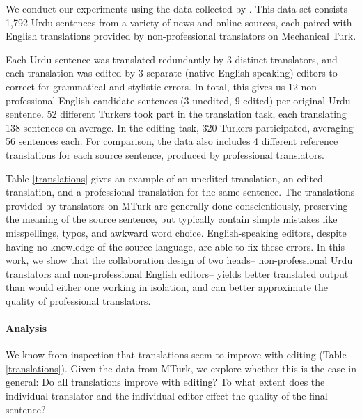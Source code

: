 \documentclass[11pt]{article}
\begin{document}
We conduct our experiments using the data collected by . This data set consists 1,792 Urdu sentences from a variety of news and online sources, each paired with English translations provided by non-professional translators on Mechanical Turk.

Each Urdu sentence was translated redundantly by 3 distinct translators, and each translation was edited by 3 separate (native English-speaking) editors to correct for grammatical and stylistic errors. In total, this gives us 12 non-professional English candidate sentences (3 unedited, 9 edited) per original Urdu sentence. 52 different Turkers took part in the translation task, each translating 138 sentences on average. In the editing task, 320 Turkers participated, averaging 56 sentences each. For comparison, the data also includes 4 different reference translations for each source sentence, produced by professional translators.

Table \ref{translations} gives an example of an unedited translation, an edited translation, and a professional translation for the same sentence. The translations provided by translators on MTurk are generally done conscientiously, preserving the meaning of the source sentence, but typically contain simple mistakes like misspellings, typos, and awkward word choice. English-speaking editors, despite having no knowledge of the source language, are able to fix these errors. In this work, we show that the collaboration design of two heads-- non-professional Urdu translators and non-professional English editors-- yields better translated output than would either one working in isolation, and can better approximate the quality of professional translators.



\paragraph{Analysis}

We know from inspection that translations seem to improve with editing (Table \ref{translations}). Given the data from MTurk, we explore whether this is the case in general: Do all translations improve with editing? To what extent does the individual translator and the individual editor effect the quality of the final sentence?
\end{document}
